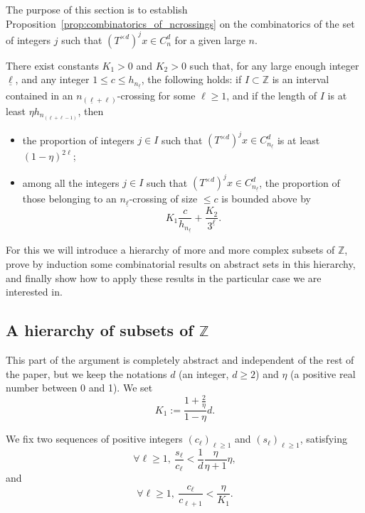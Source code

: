 \documentclass[10pt]{amsart}
\theoremstyle{definition}\newtheorem{defi}[theo]{Definition}\newtheorem{rema}[theo]{Remark}\newtheorem{exam}[theo]{Example}\newtheorem{exem}[theo]{Example}\newtheorem{nota}[theo]{Notation}
\newcommand{\egdef}{:=}
\newcommand{\ZZ}{\mathbb{Z}}
\newcommand{\cd}{C^{d}}
\newcommand{\td}{T^{\times d}}
\newcommand{\lb}{\underline{\ell}}
\let\oldforall\forall
\renewcommand*{\forall}{\mathrel{\oldforall}}
\begin{document}
The purpose of this section is to establish Proposition~\ref{prop:combinatorics_of_ncrossings} on the combinatorics of the set of integers $j$ such that $(\td)^j x\in \cd_n$ for a given large $n$.

\begin{prop}\label{prop:combinatorics_of_ncrossings}
There exist constants $K_1>0$ and $K_2>0$ such that, for any large enough integer $\lb$, and any integer $1\le c\le h_{n_{\lb}}$, the following holds: if $I\subset \ZZ$ is an interval contained in an $n_{(\lb+\ell)}$-crossing for some $\ell\ge1$, and if the length of $I$ is at least $\eta h_{n_{(\lb+\ell-1)}}$, then
\begin{itemize}
\item the proportion of integers $j\in I$ such that $(\td)^jx\in\cd_{n_{\lb}}$ is at least $(1-\eta)^{2\ell}$;
\item among all the integers $j\in I$ such that $(\td)^jx\in\cd_{n_{\lb}}$, the proportion of those belonging to an $n_{\lb}$-crossing of size $\le c$ is
bounded above by
\[
K_1 \frac{c}{h_{n_{\lb}}} + \frac{K_2}{3^{\lb}}.
\]
\end{itemize}
\end{prop}

For this we will introduce a hierarchy of more and more complex subsets of $\ZZ$, prove by induction some combinatorial results on abstract sets in this hierarchy, and finally show how to apply these results in the particular case we are interested in.

\subsection{A hierarchy of subsets of \texorpdfstring{$\ZZ$}{Z}}\label{sec:hierarchy}

This part of the argument is completely abstract and independent of the rest of the paper, but we keep the notations $d$ (an integer, $d\ge2$) and $\eta$ (a positive real number between 0 and 1). We set
\[
K_1\egdef \dfrac{1+\frac{2}{\eta}}{1-\eta}d.
\]

We fix two sequences of positive integers $\left(c_\ell\right)_{\ell\ge1}$ and $\left(s_\ell\right)_{\ell\ge1}$, satisfying
\begin{equation}\label{eq:cs_cond1}
\forall \ell\ge1,\ \frac{s_\ell}{c_\ell}<\frac{1}{d}\frac{\eta}{\eta+1}\eta,
\end{equation}
and
\begin{equation}\label{eq:cs_cond2}
\forall \ell\ge1,\ \frac{c_\ell}{c_{\ell+1}}<\frac{\eta}{K_1}.
\end{equation}
\end{document}

